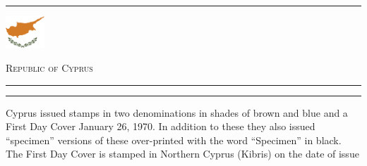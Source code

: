 \documentclass[a4paper]{article}
\begin{document}
\hrule
\vspace{8pt}
\begin{minipage}{2cm}
  \includegraphics[height=1.2cm]{images/cy}
\end{minipage}
\hfill
{\scshape\huge Republic of Cyprus}
\vspace{8pt}
\hrule
\vspace{17cm}
\begin{center}
\begin{minipage}{12cm}
  \hrule \vspace{12pt} Cyprus issued stamps in two denominations in
  shades of brown and blue and a First Day Cover January 26, 1970. In
  addition to these they also issued ``specimen'' versions of these
  over-printed with the word ``Specimen'' in black. The First Day Cover is
  stamped in Northern Cyprus (Kibris) on the date of issue
\end{minipage}
\end{center}
\end{document}
